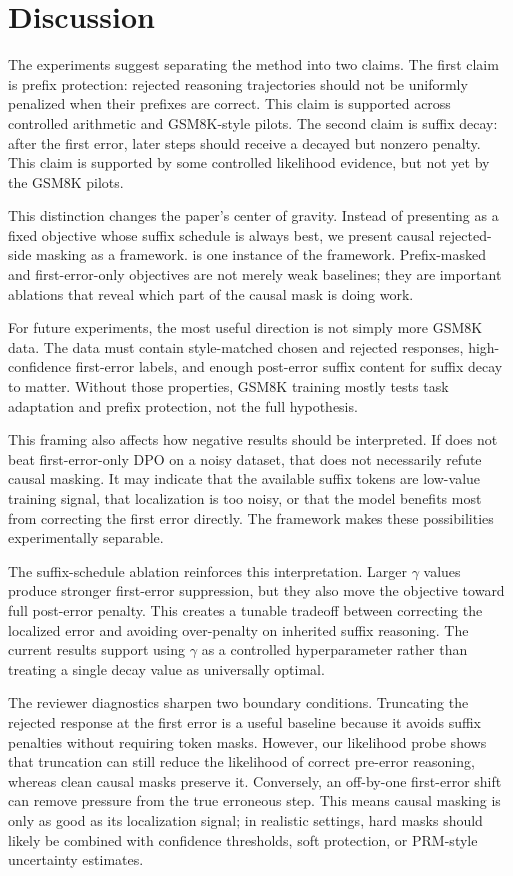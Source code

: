 \section{Discussion}

The experiments suggest separating the method into two claims. The first claim is prefix protection: rejected reasoning trajectories should not be uniformly penalized when their prefixes are correct. This claim is supported across controlled arithmetic and GSM8K-style pilots. The second claim is suffix decay: after the first error, later steps should receive a decayed but nonzero penalty. This claim is supported by some controlled likelihood evidence, but not yet by the GSM8K pilots.

This distinction changes the paper's center of gravity. Instead of presenting \cmdpo{} as a fixed objective whose suffix schedule is always best, we present causal rejected-side masking as a framework. \cmdpo{} is one instance of the framework. Prefix-masked and first-error-only objectives are not merely weak baselines; they are important ablations that reveal which part of the causal mask is doing work.

For future experiments, the most useful direction is not simply more GSM8K data. The data must contain style-matched chosen and rejected responses, high-confidence first-error labels, and enough post-error suffix content for suffix decay to matter. Without those properties, GSM8K training mostly tests task adaptation and prefix protection, not the full \cmdpo{} hypothesis.

This framing also affects how negative results should be interpreted. If \cmdpo{} does not beat first-error-only DPO on a noisy dataset, that does not necessarily refute causal masking. It may indicate that the available suffix tokens are low-value training signal, that localization is too noisy, or that the model benefits most from correcting the first error directly. The framework makes these possibilities experimentally separable.

The suffix-schedule ablation reinforces this interpretation. Larger $\gamma$ values produce stronger first-error suppression, but they also move the objective toward full post-error penalty. This creates a tunable tradeoff between correcting the localized error and avoiding over-penalty on inherited suffix reasoning. The current results support using $\gamma$ as a controlled hyperparameter rather than treating a single decay value as universally optimal.

The reviewer diagnostics sharpen two boundary conditions. Truncating the rejected response at the first error is a useful baseline because it avoids suffix penalties without requiring token masks. However, our likelihood probe shows that truncation can still reduce the likelihood of correct pre-error reasoning, whereas clean causal masks preserve it. Conversely, an off-by-one first-error shift can remove pressure from the true erroneous step. This means causal masking is only as good as its localization signal; in realistic settings, hard masks should likely be combined with confidence thresholds, soft protection, or PRM-style uncertainty estimates.

